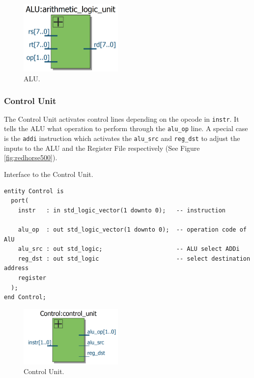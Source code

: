 \documentclass[a4paper, 11pt,oneside]{article}
\begin{document}
\begin{figure}[H]
	\begin{center}
	\includegraphics[width=2in]{alu.png}
	\caption{ALU.}
	\label{fig:alu} 
	\end{center}
\end{figure}

\subsubsection{Control Unit}
The Control Unit activates control lines depending on the opcode in 
\texttt{instr}. It tells the ALU what operation to perform through 
the \texttt{alu_op} line. A special case is 
the \texttt{addi} instruction which activates the 
\texttt{alu_src} and \texttt{reg_dst} to adjust the 
inputs to the ALU and the Register File respectively (See Figure 
\ref{fig:redhorse500}). 


\begin{listing}[H]
\caption{Interface to the Control Unit.}
\label{code:control}
\begin{verbatim}
entity Control is
  port(
    instr   : in std_logic_vector(1 downto 0);   -- instruction

    alu_op  : out std_logic_vector(1 downto 0);  -- operation code of AlU
    alu_src : out std_logic;                     -- ALU select ADDi
    reg_dst : out std_logic                      -- select destination address 
    register
  );
end Control;
\end{verbatim}
\end{listing}

\begin{figure}[H]
	\begin{center}
	\includegraphics[width=2in]{control_unit.png}
	\caption{Control Unit.}
	\label{fig:cu} 
	\end{center}
\end{figure}
\end{document}

